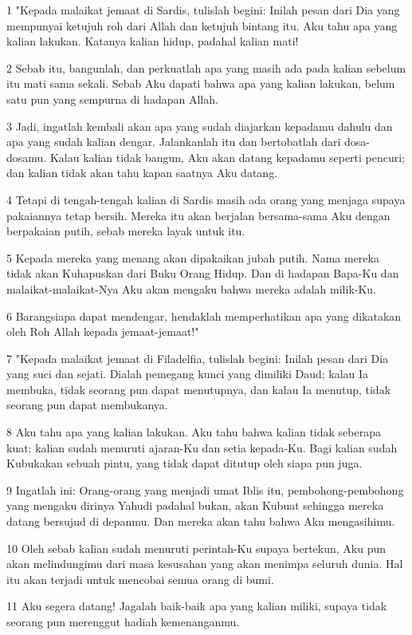 \par 1 "Kepada malaikat jemaat di Sardis, tulislah begini: Inilah pesan dari Dia yang mempunyai ketujuh roh dari Allah dan ketujuh bintang itu. Aku tahu apa yang kalian lakukan. Katanya kalian hidup, padahal kalian mati!
\par 2 Sebab itu, bangunlah, dan perkuatlah apa yang masih ada pada kalian sebelum itu mati sama sekali. Sebab Aku dapati bahwa apa yang kalian lakukan, belum satu pun yang sempurna di hadapan Allah.
\par 3 Jadi, ingatlah kembali akan apa yang sudah diajarkan kepadamu dahulu dan apa yang sudah kalian dengar. Jalankanlah itu dan bertobatlah dari dosa-dosamu. Kalau kalian tidak bangun, Aku akan datang kepadamu seperti pencuri; dan kalian tidak akan tahu kapan saatnya Aku datang.
\par 4 Tetapi di tengah-tengah kalian di Sardis masih ada orang yang menjaga supaya pakaiannya tetap bersih. Mereka itu akan berjalan bersama-sama Aku dengan berpakaian putih, sebab mereka layak untuk itu.
\par 5 Kepada mereka yang menang akan dipakaikan jubah putih. Nama mereka tidak akan Kuhapuskan dari Buku Orang Hidup. Dan di hadapan Bapa-Ku dan malaikat-malaikat-Nya Aku akan mengaku bahwa mereka adalah milik-Ku.
\par 6 Barangsiapa dapat mendengar, hendaklah memperhatikan apa yang dikatakan oleh Roh Allah kepada jemaat-jemaat!"
\par 7 "Kepada malaikat jemaat di Filadelfia, tulislah begini: Inilah pesan dari Dia yang suci dan sejati. Dialah pemegang kunci yang dimiliki Daud; kalau Ia membuka, tidak seorang pun dapat menutupnya, dan kalau Ia menutup, tidak seorang pun dapat membukanya.
\par 8 Aku tahu apa yang kalian lakukan. Aku tahu bahwa kalian tidak seberapa kuat; kalian sudah menuruti ajaran-Ku dan setia kepada-Ku. Bagi kalian sudah Kubukakan sebuah pintu, yang tidak dapat ditutup oleh siapa pun juga.
\par 9 Ingatlah ini: Orang-orang yang menjadi umat Iblis itu, pembohong-pembohong yang mengaku dirinya Yahudi padahal bukan, akan Kubuat sehingga mereka datang bersujud di depanmu. Dan mereka akan tahu bahwa Aku mengasihimu.
\par 10 Oleh sebab kalian sudah menuruti perintah-Ku supaya bertekun, Aku pun akan melindungimu dari masa kesusahan yang akan menimpa seluruh dunia. Hal itu akan terjadi untuk mencobai semua orang di bumi.
\par 11 Aku segera datang! Jagalah baik-baik apa yang kalian miliki, supaya tidak seorang pun merenggut hadiah kemenanganmu.
